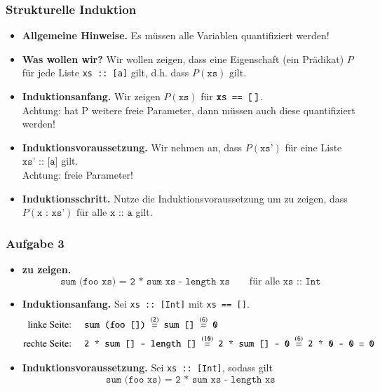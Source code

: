 \documentclass[aspectratio=1610,onlymath, ngerman]{beamer}
\renewcommand{\emph}[1]{\textbf{#1}}
\newcommand{\coloremph}[1]{\textcolor{cdpurple}{#1}}
\newcommand{\cw}[1]{\texttt{#1}}
\newcommand{\step}[2][]{\ensuremath{\overset{{#1} (\text{#2})}{=}}}
\begin{document}
\begin{frame} \frametitle{Strukturelle Induktion}
\small
\begin{itemize}
	\item \emph{Allgemeine Hinweise.} Es müssen \coloremph{alle} Variablen quantifiziert werden!
	\medskip
	\item \emph{Was wollen wir?} Wir wollen \coloremph{zeigen}, dass eine Eigenschaft (ein Prädikat) $P$ für jede Liste \texttt{xs :: [a]} gilt, d.h. dass $P(\texttt{xs})$ gilt.
	\pause
	\bigskip
	\item \emph{Induktionsanfang.} Wir zeigen $P(\texttt{xs})$ für $\texttt{xs == [\,]}$. \\
	Achtung: hat P weitere freie Parameter, dann müssen auch diese quantifiziert werden!
	\pause
	\medskip	
	\item \emph{Induktionsvoraussetzung.} Wir nehmen an, dass $P(\texttt{xs'})$ für eine Liste $\texttt{xs' :: [a]}$ gilt. \\
	Achtung: freie Parameter!
	\pause
	\medskip
	\item \emph{Induktionsschritt.} Nutze die Induktionsvoraussetzung um zu zeigen, dass $P(\texttt{x : xs'})$ für alle $\texttt{x :: a}$ gilt.
\end{itemize}
\end{frame}

\begin{frame} \frametitle{Aufgabe 3}
\small
	\begin{itemize}
		\item \emph{zu zeigen.} 
		\begin{equation*}
			\cw{sum (foo xs) = 2 * sum xs - length xs} \qquad \text{für alle } \cw{xs :: Int}
		\end{equation*}
		
		\pause
		\medskip
		
		\item \emph{Induktionsanfang.} \quad Sei \cw{xs :: [Int]} mit \cw{xs == []}. 
		\begin{align*}
			\text{linke Seite: } \quad &\cw{sum (foo []) \step{2} sum [] \step{6} 0} \\
			\text{rechte Seite: } \quad &\cw{2 * sum [] - length [] \step{10} 2 * sum [] - 0 \step{6} 2 * 0 - 0 = 0}
		\end{align*}
		
		\pause
		\medskip
		
		\item \emph{Induktionsvoraussetzung.} \quad Sei \cw{xs :: [Int]}, sodass gilt
		\begin{equation*}
		\cw{sum (foo xs) = 2 * sum xs - length xs}
		\end{equation*}
	\end{itemize}
\end{frame}
\end{document}
